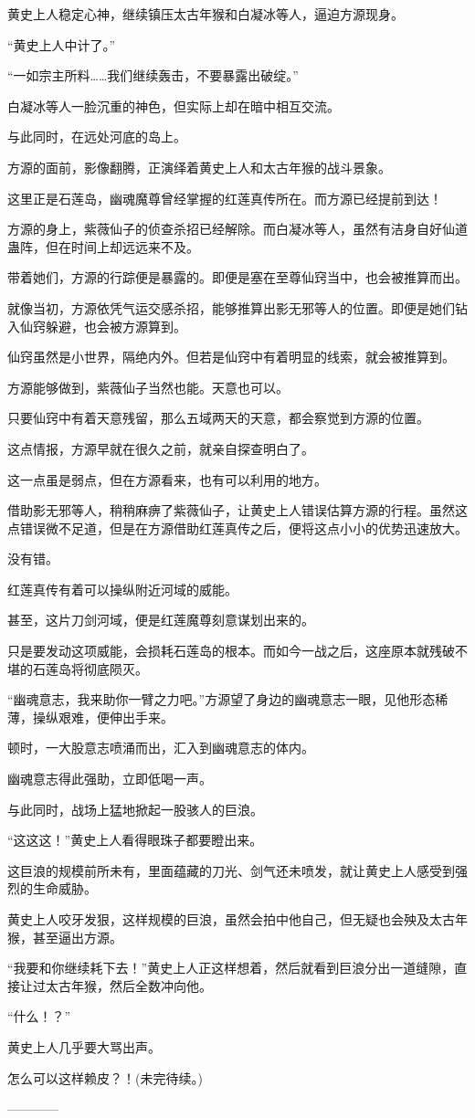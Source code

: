 \begin{this_body}
黄史上人稳定心神，继续镇压太古年猴和白凝冰等人，逼迫方源现身。

“黄史上人中计了。”

“一如宗主所料……我们继续轰击，不要暴露出破绽。”

白凝冰等人一脸沉重的神色，但实际上却在暗中相互交流。

与此同时，在远处河底的岛上。

方源的面前，影像翻腾，正演绎着黄史上人和太古年猴的战斗景象。

这里正是石莲岛，幽魂魔尊曾经掌握的红莲真传所在。而方源已经提前到达！

方源的身上，紫薇仙子的侦查杀招已经解除。而白凝冰等人，虽然有洁身自好仙道蛊阵，但在时间上却远远来不及。

带着她们，方源的行踪便是暴露的。即便是塞在至尊仙窍当中，也会被推算而出。

就像当初，方源依凭气运交感杀招，能够推算出影无邪等人的位置。即便是她们钻入仙窍躲避，也会被方源算到。

仙窍虽然是小世界，隔绝内外。但若是仙窍中有着明显的线索，就会被推算到。

方源能够做到，紫薇仙子当然也能。天意也可以。

只要仙窍中有着天意残留，那么五域两天的天意，都会察觉到方源的位置。

这点情报，方源早就在很久之前，就亲自探查明白了。

这一点虽是弱点，但在方源看来，也有可以利用的地方。

借助影无邪等人，稍稍麻痹了紫薇仙子，让黄史上人错误估算方源的行程。虽然这点错误微不足道，但是在方源借助红莲真传之后，便将这点小小的优势迅速放大。

没有错。

红莲真传有着可以操纵附近河域的威能。

甚至，这片刀剑河域，便是红莲魔尊刻意谋划出来的。

只是要发动这项威能，会损耗石莲岛的根本。而如今一战之后，这座原本就残破不堪的石莲岛将彻底陨灭。

“幽魂意志，我来助你一臂之力吧。”方源望了身边的幽魂意志一眼，见他形态稀薄，操纵艰难，便伸出手来。

顿时，一大股意志喷涌而出，汇入到幽魂意志的体内。

幽魂意志得此强助，立即低喝一声。

与此同时，战场上猛地掀起一股骇人的巨浪。

“这这这！”黄史上人看得眼珠子都要瞪出来。

这巨浪的规模前所未有，里面蕴藏的刀光、剑气还未喷发，就让黄史上人感受到强烈的生命威胁。

黄史上人咬牙发狠，这样规模的巨浪，虽然会拍中他自己，但无疑也会殃及太古年猴，甚至逼出方源。

“我要和你继续耗下去！”黄史上人正这样想着，然后就看到巨浪分出一道缝隙，直接让过太古年猴，然后全数冲向他。

“什么！？”

黄史上人几乎要大骂出声。

怎么可以这样赖皮？！(未完待续。)

------------

\end{this_body}

